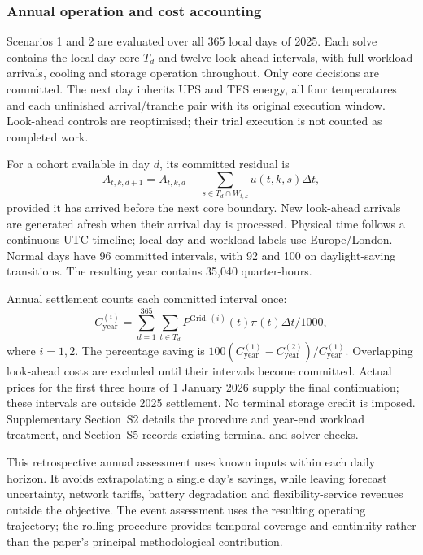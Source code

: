 \subsubsection{Annual operation and cost accounting}\label{sec:annual-operation}
Scenarios 1 and 2 are evaluated over all 365 local days of 2025. Each solve contains the local-day core $T_d$ and twelve look-ahead intervals, with full workload arrivals, cooling and storage operation throughout. Only core decisions are committed. The next day inherits UPS and TES energy, all four temperatures and each unfinished arrival/tranche pair with its original execution window. Look-ahead controls are reoptimised; their trial execution is not counted as completed work.

For a cohort available in day $d$, its committed residual is
\begin{equation}
A_{t,k,d+1}=A_{t,k,d}-\sum_{s\in T_d\cap W_{t,k}}u(t,k,s)\Delta t,
\label{eq:cohort-handoff}
\end{equation}
provided it has arrived before the next core boundary. New look-ahead arrivals are generated afresh when their arrival day is processed. Physical time follows a continuous UTC timeline; local-day and workload labels use Europe/London. Normal days have 96 committed intervals, with 92 and 100 on daylight-saving transitions. The resulting year contains 35,040 quarter-hours.

Annual settlement counts each committed interval once:
\begin{equation}
C^{(i)}_{\mathrm{year}}=\sum_{d=1}^{365}\sum_{t\in T_d}P^{\mathrm{Grid},(i)}(t)\pi(t)\Delta t/1000,
\label{eq:annual-cost}
\end{equation}
where $i=1,2$. The percentage saving is $100(C^{(1)}_{\mathrm{year}}-C^{(2)}_{\mathrm{year}})/C^{(1)}_{\mathrm{year}}$. Overlapping look-ahead costs are excluded until their intervals become committed. Actual prices for the first three hours of 1 January 2026 supply the final continuation; these intervals are outside 2025 settlement. No terminal storage credit is imposed. Supplementary Section~S2 details the procedure and year-end workload treatment, and Section~S5 records existing terminal and solver checks.

This retrospective annual assessment uses known inputs within each daily horizon. It avoids extrapolating a single day's savings, while leaving forecast uncertainty, network tariffs, battery degradation and flexibility-service revenues outside the objective. The event assessment uses the resulting operating trajectory; the rolling procedure provides temporal coverage and continuity rather than the paper's principal methodological contribution.
